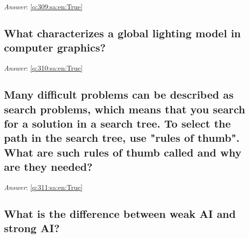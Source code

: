 \documentclass[a4paper,11pt,oneside]{article}
\begin{document}
\begin{sloppypar}
\label{q:309:sa:en:False}

\vspace{2cm}

\noindent\makebox[\textwidth]{\hrulefill}

\vspace{1cm}

\textit{Answer}: \autoref{q:309:sa:en:True}



\subsection{What characterizes a global lighting model in computer graphics?}

\label{q:310:sa:en:False}

\vspace{2cm}

\noindent\makebox[\textwidth]{\hrulefill}

\vspace{1cm}

\textit{Answer}: \autoref{q:310:sa:en:True}



\subsection{Many difficult problems can be described as search problems, which means that you search for a solution in a search tree. To select the path in the search tree, use "rules of thumb". What are such rules of thumb called and why are they needed?}

\label{q:311:sa:en:False}

\vspace{2cm}

\noindent\makebox[\textwidth]{\hrulefill}

\vspace{1cm}

\textit{Answer}: \autoref{q:311:sa:en:True}



\subsection{What is the difference between weak AI and strong AI?}

\label{q:312:sa:en:False}

\vspace{2cm}

\noindent\makebox[\textwidth]{\hrulefill}


\end{sloppypar}
\end{document}
